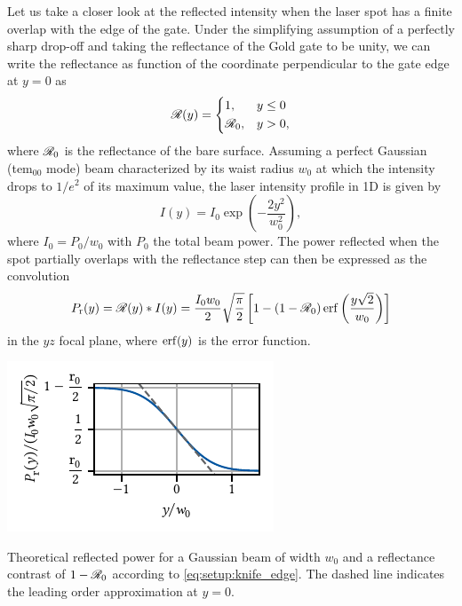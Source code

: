 Let us take a closer look at the reflected intensity when the laser spot has a finite overlap with the edge of the gate.
Under the simplifying assumption of a perfectly sharp drop-off and taking the reflectance of the Gold gate to be unity, we can write the reflectance as function of the coordinate perpendicular to the gate edge at $y=0$ as
\begin{equation}\label{eq:setup:reflectance_step}
    \mathscr{R}(y) = \begin{dcases}
        1, & y \leq 0 \\
        \mathscr{R}_0, & y > 0,
    \end{dcases}
\end{equation}
where $\mathscr{R}_0$ is the reflectance of the bare  surface.
Assuming a perfect Gaussian (\gls{tem}$_{00}$ mode) beam characterized by its waist radius $w_0$ at which the intensity drops to $1/e^2$ of its maximum value, the laser intensity profile in 1D is given by
\begin{equation}\label{eq:setup:gaussian}
    I(y) = I_0\exp(-\frac{2y^2}{w_0^2}),
\end{equation}
where $I_0 = P_0/w_0$ with $P_0$ the total beam power.
The power reflected when the spot partially overlaps with the reflectance step can then be expressed as the convolution
\begin{equation}\label{eq:setup:knife_edge}
    P_{\mr{r}}(y) = \reflectance(y) \ast I(y) = \frac{I_0 w_0}{2}\sqrt{\frac{\pi}{2}}\left[ 1 - (1 - \reflectance_0)\erf\left(\frac{y\sqrt{2}}{w_0}\right) \right]
\end{equation}
in the $yz$ focal plane, where $\erf(y)$ is the error function.

\begin{marginfigure}
    \centering
    \includegraphics{img/pdf/setup/knife_edge_theory}
    \caption[]{
        Theoretical reflected power for a Gaussian beam of width $w_0$ and a reflectance contrast of $1-\mathscr{R}_0$ according to \cref{eq:setup:knife_edge}.
        The dashed line indicates the leading order approximation at $y=0$.
    }
    \label{fig:setup:vibrations:knife_edge:theory}
\end{marginfigure}

